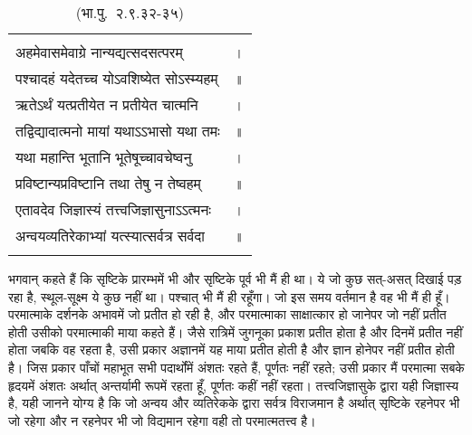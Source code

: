 {\bfseries
\setlength{\mylenone}{0pt}
\settowidth{\mylentwo}{अहमेवासमेवाग्रे नान्यद्यत्सदसत्परम्}
\setlength{\mylenone}{\maxof{\mylenone}{\mylentwo}}
\settowidth{\mylentwo}{पश्चादहं यदेतच्च योऽवशिष्येत सोऽस्म्यहम्}
\setlength{\mylenone}{\maxof{\mylenone}{\mylentwo}}
\settowidth{\mylentwo}{ऋतेऽर्थं यत्प्रतीयेत न प्रतीयेत चात्मनि}
\setlength{\mylenone}{\maxof{\mylenone}{\mylentwo}}
\settowidth{\mylentwo}{तद्विद्यादात्मनो मायां यथाऽऽभासो यथा तमः}
\setlength{\mylenone}{\maxof{\mylenone}{\mylentwo}}
\settowidth{\mylentwo}{यथा महान्ति भूतानि भूतेषूच्चावचेष्वनु}
\setlength{\mylenone}{\maxof{\mylenone}{\mylentwo}}
\settowidth{\mylentwo}{प्रविष्टान्यप्रविष्टानि तथा तेषु न तेष्वहम्}
\setlength{\mylenone}{\maxof{\mylenone}{\mylentwo}}
\settowidth{\mylentwo}{एतावदेव जिज्ञास्यं तत्त्वजिज्ञासुनाऽऽत्मनः}
\setlength{\mylenone}{\maxof{\mylenone}{\mylentwo}}
\settowidth{\mylentwo}{अन्वयव्यतिरेकाभ्यां यत्स्यात्सर्वत्र सर्वदा}
\setlength{\mylenone}{\maxof{\mylenone}{\mylentwo}}
\setlength{\mylentwo}{\baselineskip}
\setlength{\mylenone}{\mylenone + 1pt}
\begin{longtable}[l]{@{\hspace*{\mylen}}>{\setlength\parfillskip{0pt}}p{\mylenone}@{}@{}l@{}}
 & \\[-\the\mylentwo]
अहमेवासमेवाग्रे नान्यद्यत्सदसत्परम् & ।\\ \nopagebreak
पश्चादहं यदेतच्च योऽवशिष्येत सोऽस्म्यहम् & ॥\\
ऋतेऽर्थं यत्प्रतीयेत न प्रतीयेत चात्मनि & ।\\ \nopagebreak
तद्विद्यादात्मनो मायां यथाऽऽभासो यथा तमः & ॥\\
यथा महान्ति भूतानि भूतेषूच्चावचेष्वनु & ।\\ \nopagebreak
प्रविष्टान्यप्रविष्टानि तथा तेषु न तेष्वहम् & ॥\\
एतावदेव जिज्ञास्यं तत्त्वजिज्ञासुनाऽऽत्मनः & ।\\ \nopagebreak
अन्वयव्यतिरेकाभ्यां यत्स्यात्सर्वत्र सर्वदा & ॥\\ \nopagebreak
\caption*{(भा.पु.~२.९.३२-३५)}
\end{longtable}
}

\begin{sloppypar}\justifying{}
भगवान् कहते हैं कि सृष्टिके प्रारम्भमें भी और सृष्टिके पूर्व भी मैं ही था। ये जो कुछ सत्-असत् दिखाई पड़ रहा है, स्थूल-सूक्ष्म ये कुछ नहीं था। पश्चात् भी मैं ही रहूँगा। जो इस समय वर्तमान है वह भी मैं ही हूँ। परमात्माके दर्शनके अभावमें जो प्रतीत हो रही है, और परमात्माका साक्षात्कार हो जानेपर जो नहीं प्रतीत होती उसीको परमात्माकी माया कहते हैं। जैसे रात्रिमें जुगनूका प्रकाश प्रतीत होता है और दिनमें प्रतीत नहीं होता जबकि वह रहता है, उसी प्रकार अज्ञानमें यह माया प्रतीत होती है और ज्ञान होनेपर नहीं प्रतीत होती है। जिस प्रकार पाँचों महाभूत सभी पदार्थोंमें अंशतः रहते हैं, पूर्णतः नहीं रहते; उसी प्रकार मैं परमात्मा सबके हृदयमें अंशतः अर्थात् अन्तर्यामी रूपमें रहता हूँ, पूर्णतः कहीं नहीं रहता। तत्त्वजिज्ञासुके द्वारा यही जिज्ञास्य है, यही जानने योग्य है कि जो अन्वय और व्यतिरेकके द्वारा सर्वत्र विराजमान है अर्थात् सृष्टिके रहनेपर भी जो रहेगा और न रहनेपर भी जो विद्यमान रहेगा वही तो परमात्मतत्त्व है।
\end{sloppypar}

